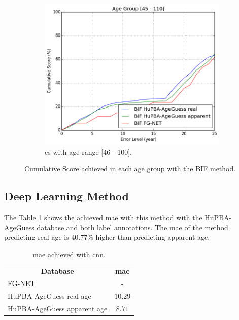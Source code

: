\begin{figure}[!h]
	\vspace{0.5cm}
	\begin{subfigure}[b]{0.5\textwidth}
		\includegraphics[width=\textwidth]{figures/results_hybrid_cum_score_good_ag2}
		\caption{\acrshort{cs} with age range [46 - 100].}
		\label{fig:cumS_BIF_ag2}
	\end{subfigure}
	\caption{Cumulative Score achieved in each age group with the BIF method.}\label{fig:cumBIF_gr}
\end{figure}

\subsection{Deep Learning Method}

The Table \ref{tab:CNNresults} shows the achieved \gls{mae} with this method with the HuPBA-AgeGuess database and both label annotations. The \gls{mae} of the method predicting real age is $40.77\%$ higher than predicting apparent age.

\begin{table}[!h]
	\centering
	\begin{tabular}{|l||c|}
		\hline
		\multicolumn{1}{|c||}{\textbf{Database}} & \textbf{\gls{mae}}\\ \hhline{=#=}
		FG-NET & - \\ 		\hline
		HuPBA-AgeGuess real age & $10.29$\\ \hline
		HuPBA-AgeGuess apparent age & $8.71$\\ \hline
		
	\end{tabular}
	\caption{\acrshort{mae} achieved with \acrshort{cnn}.}
	\label{tab:CNNresults}
\end{table}

